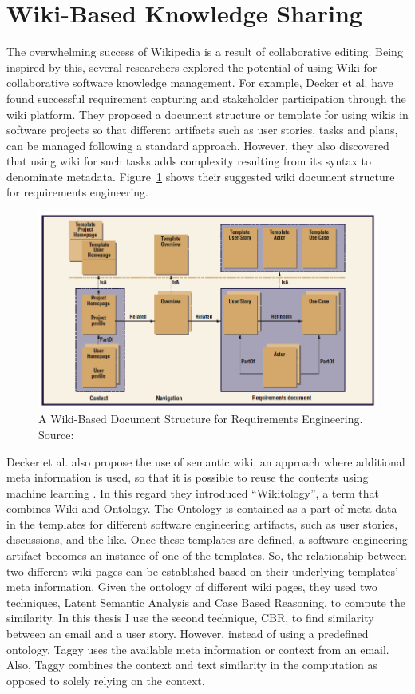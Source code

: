 \section{Wiki-Based Knowledge Sharing}
The overwhelming success of Wikipedia \cite{wikipedia} is a result of collaborative editing. Being inspired by this, several researchers explored the potential of using Wiki for collaborative software knowledge management. For example, Decker et al. have found successful requirement capturing and stakeholder participation through the wiki platform\cite{wiki_based}. They proposed a document structure or template for using wikis in software projects so that different artifacts such as user stories, tasks and plans, can be managed following a standard approach. However, they also discovered that using wiki for such tasks adds complexity resulting from its syntax to denominate metadata. Figure~\ref{fig:wiki} shows their suggested wiki document structure for requirements engineering.

\begin{figure}[bt]
	\centering
	\includegraphics[width=\textwidth]{Wiki.png}
    \caption{A Wiki-Based Document Structure for Requirements Engineering. Source: \cite{wiki_based}}
	\label{fig:wiki}
\end{figure}

Decker et al. also propose the use of semantic wiki, an approach where additional meta information is used, so that it is possible to reuse the contents using machine learning \cite{self_organized}. In this regard they introduced ``Wikitology'', a term that combines Wiki and Ontology. The Ontology is contained as a part of meta-data in the templates for different software engineering artifacts, such as user stories, discussions, and the like. Once these templates are defined, a software engineering artifact becomes an instance of one of the templates. So, the relationship between two different wiki pages can be established based on their underlying templates' meta information. Given the ontology of different wiki pages, they used two techniques, Latent Semantic Analysis and Case Based Reasoning, to compute the similarity. In this thesis I use the second technique, CBR, to find similarity between an email and a user story. However, instead of using a predefined ontology, Taggy uses the available meta information or context from an email. Also, Taggy combines the context and text similarity in the computation as opposed to solely relying on the context.

